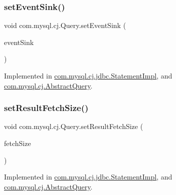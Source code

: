 \subsubsection{\texorpdfstring{set\+Event\+Sink()}{setEventSink()}}
{\footnotesize\ttfamily void com.\+mysql.\+cj.\+Query.\+set\+Event\+Sink (\begin{DoxyParamCaption}\item[{\mbox{\hyperlink{interfacecom_1_1mysql_1_1cj_1_1log_1_1_profiler_event_handler}{Profiler\+Event\+Handler}}}]{event\+Sink }\end{DoxyParamCaption})}



Implemented in \mbox{\hyperlink{classcom_1_1mysql_1_1cj_1_1jdbc_1_1_statement_impl_a7f46764af12c9648ac8ac2929b275fd4}{com.\+mysql.\+cj.\+jdbc.\+Statement\+Impl}}, and \mbox{\hyperlink{classcom_1_1mysql_1_1cj_1_1_abstract_query_a025ef4b53a1ce527b74fc4d37b87ffcc}{com.\+mysql.\+cj.\+Abstract\+Query}}.

\mbox{\label{interfacecom_1_1mysql_1_1cj_1_1_query_aa27382e91d04ac9f8f6944dc3949b652}} 
\subsubsection{\texorpdfstring{set\+Result\+Fetch\+Size()}{setResultFetchSize()}}
{\footnotesize\ttfamily void com.\+mysql.\+cj.\+Query.\+set\+Result\+Fetch\+Size (\begin{DoxyParamCaption}\item[{int}]{fetch\+Size }\end{DoxyParamCaption})}



Implemented in \mbox{\hyperlink{classcom_1_1mysql_1_1cj_1_1jdbc_1_1_statement_impl_a54925c630ea2ab107815206f742e7be9}{com.\+mysql.\+cj.\+jdbc.\+Statement\+Impl}}, and \mbox{\hyperlink{classcom_1_1mysql_1_1cj_1_1_abstract_query_a02cd9bee7792ccf53455cd42df11b27a}{com.\+mysql.\+cj.\+Abstract\+Query}}.

\mbox{\label{interfacecom_1_1mysql_1_1cj_1_1_query_abb2b03623cac9e35394b4ed22008f683}} 
